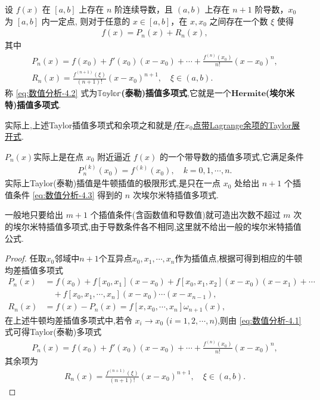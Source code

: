 \documentclass[../../main.tex]{subfiles}%
\begin{document}
\begin{theorem}
设 $f(x)$ 在 $[a, b]$ 上存在 $n$ 阶连续导数，且 $(a, b)$ 上存在 $n + 1$ 阶导数，$x_0$ 为 $[a, b]$ 内一定点,
则对于任意的 $x \in [a, b]$，在 $x, x_0$ 之间存在一个数 $\xi$ 使得
\begin{align*}
f(x) = P_n(x)+R_n(x),
\end{align*}
其中
\begin{gather}
P_n(x) = f(x_0) + f'(x_0)(x - x_0) + \cdots + \frac{f^{(n)}(x_0)}{n!}(x - x_0)^n,\label{eq:数值分析-4.2}
\\
R_n(x) = \frac{f^{(n+1)}(\xi)}{(n+1)!}(x - x_0)^{n+1}, \quad \xi \in (a, b).\label{eq:数值分析-4.4}
\end{gather}
称 \eqref{eq:数值分析-4.2} 式为$\mathbb{Taylor}$\textbf{(泰勒)插值多项式},它就是一个$\mathbf{Hermite}$\textbf{(埃尔米特)插值多项式}.
\end{theorem}
\begin{remark}
实际上,上述Taylor插值多项式和余项之和就是\hyperref[Basis of Analytics-theorem:带各种余项的Taylor公式]{$f$在$x_0$点带Lagrange余项的Taylor展开式}.
\end{remark}
\begin{remark}
$P_n(x)$实际上是在点 $x_0$ 附近逼近 $f(x)$ 的一个带导数的插值多项式,它满足条件
\begin{align}
P_n^{(k)}(x_0) = f^{(k)}(x_0), \quad k = 0, 1, \cdots, n. \label{eq:数值分析-4.3}
\end{align}
实际上Taylor(泰勒)插值是牛顿插值的极限形式,是只在一点 $x_0$ 处给出 $n + 1$ 个插值条件 \eqref{eq:数值分析-4.3} 得到的 $n$ 次埃尔米特插值多项式.

一般地只要给出 $m + 1$ 个插值条件(含函数值和导数值)就可造出次数不超过 $m$ 次的埃尔米特插值多项式,由于导数条件各不相同,这里就不给出一般的埃尔米特插值公式.
\end{remark}
\begin{proof}
任取$x_0$邻域中$n+1$个互异点$x_0,x_1,\cdots,x_n$作为插值点,根据可得到相应的牛顿均差插值多项式
\begin{align*}
P_n(x) &= f(x_0) + f[x_0, x_1](x - x_0) + f[x_0, x_1, x_2](x - x_0)(x - x_1) + \cdots  \\
&\quad + f[x_0, x_1, \cdots, x_n](x - x_0) \cdots (x - x_{n-1}),\\
R_n(x) &= f(x) - P_n(x) = f[x, x_0, \cdots, x_n]\omega_{n+1}(x),
\end{align*}
在上述牛顿均差插值多项式中,若令 $x_i \to x_0$ ($i = 1, 2, \cdots, n$),则由 \eqref{eq:数值分析-4.1} 式可得Taylor(泰勒)多项式
\begin{align*}
P_n(x) = f(x_0) + f'(x_0)(x - x_0) + \cdots + \frac{f^{(n)}(x_0)}{n!}(x - x_0)^n, 
\end{align*}
其余项为
\begin{align*}
R_n(x) = \frac{f^{(n+1)}(\xi)}{(n+1)!}(x - x_0)^{n+1}, \quad \xi \in (a, b). 
\end{align*}

\end{proof}
\end{document}
